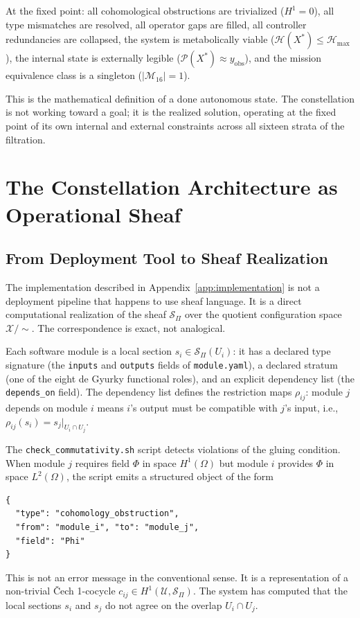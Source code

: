 \documentclass[11pt, oneside]{article}
\newcommand{\Xmod}{\mathcal{X}/{\sim}}
\begin{document}
At the fixed point: all cohomological obstructions are trivialized ($H^1 = 0$), all type
mismatches are resolved, all operator gaps are filled, all controller redundancies are
collapsed, the system is metabolically viable ($\mathcal{H}(X^*) \le \mathcal{H}_{\max}$),
the internal state is externally legible ($\mathcal{P}(X^*) \approx y_{\mathrm{obs}}$),
and the mission equivalence class is a singleton ($|\mathcal{M}_{16}| = 1$).

This is the mathematical definition of a done autonomous state. The constellation is not
working toward a goal; it is the realized solution, operating at the fixed point of its
own internal and external constraints across all sixteen strata of the filtration.

\section{The Constellation Architecture as Operational Sheaf}
\label{app:constellation}

\subsection{From Deployment Tool to Sheaf Realization}

The implementation described in Appendix~\ref{app:implementation} is not a deployment
pipeline that happens to use sheaf language. It is a direct computational realization
of the sheaf $\mathcal{S}_\Pi$ over the quotient configuration space $\Xmod$. The
correspondence is exact, not analogical.

Each software module is a local section $s_i \in \mathcal{S}_\Pi(U_i)$: it has a
declared type signature (the \texttt{inputs} and \texttt{outputs} fields of
\texttt{module.yaml}), a declared stratum (one of the eight de Gyurky functional roles),
and an explicit dependency list (the \texttt{depends\_on} field). The dependency list
defines the restriction maps $\rho_{ij}$: module $j$ depends on module $i$ means $i$'s
output must be compatible with $j$'s input, i.e., $\rho_{ij}(s_i) = s_j|_{U_i \cap U_j}$.

The \texttt{check\_commutativity.sh} script detects violations of the gluing condition.
When module $j$ requires field $\Phi$ in space $H^1(\Omega)$ but module $i$ provides
$\Phi$ in space $L^2(\Omega)$, the script emits a structured object of the form
\begin{verbatim}
{
  "type": "cohomology_obstruction",
  "from": "module_i", "to": "module_j",
  "field": "Phi"
}
\end{verbatim}
This is not an error message in the conventional sense. It is a representation of a
non-trivial \v{C}ech 1-cocycle $c_{ij} \in H^1(\mathcal{U}, \mathcal{S}_\Pi)$. The
system has computed that the local sections $s_i$ and $s_j$ do not agree on the
overlap $U_i \cap U_j$.
\end{document}
